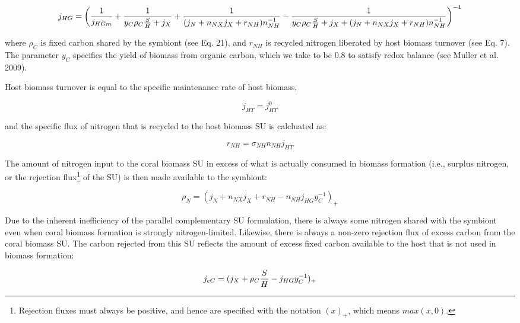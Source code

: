 \documentclass[]{elsarticle} %
\begin{document}
\begin{equation} j_{HG} = \bigg({1 \over j_{HGm}} + {1 \over {y_{C}\rho_C{S \over H} + j_X}} + {1 \over {(j_N + n_{NX}j_X + r_{NH})n_{NH}^{-1}}} - {1 \over {y_{C}{\rho_C{S \over H} + j_X} + (j_N + n_{NX}j_X + r_{NH})n_{NH}^{-1}}}\bigg)^{-1} \end{equation}

where \(\rho_C\) is fixed carbon shared by the symbiont (see Eq. 21),
and \(r_{NH}\) is recycled nitrogen liberated by host biomass turnover
(see Eq. 7). The parameter \(y_C\) specifies the yield of biomass from
organic carbon, which we take to be 0.8 to satisfy redox balance (see
Muller et al. 2009).

Host biomass turnover is equal to the specific maintenance rate of host
biomass,

\begin{equation} j_{HT}=j_{HT}^0 \end{equation}

and the specific flux of nitrogen that is recycled to the host biomass
SU is calcluated as:

\begin{equation} r_{NH}=\sigma_{NH}n_{NH}j_{HT} \end{equation}

The amount of nitrogen input to the coral biomass SU in excess of what
is actually consumed in biomass formation (i.e., surplus nitrogen, or
the rejection flux\footnote{Rejection fluxes must always be positive,
  and hence are specified with the notation \((x)_+\), which means
  \(max(x, 0)\).} of the SU) is then made available to the symbiont:

\begin{equation} \rho_N = (j_N + n_{NX}j_X + r_{NH} - n_{NH}j_{HG}y_{C}^{-1})_+ \end{equation}

Due to the inherent inefficiency of the parallel complementary SU
formulation, there is always some nitrogen shared with the symbiont even
when coral biomass formation is strongly nitrogen-limited. Likewise,
there is always a non-zero rejection flux of excess carbon from the
coral biomass SU. The carbon rejected from this SU reflects the amount
of excess fixed carbon available to the host that is not used in biomass
formation:

\begin{equation} j_{eC} = (j_X + \rho_C{S \over H} - j_{HG}y_{C}^{-1})_+ \end{equation}
\end{document}
